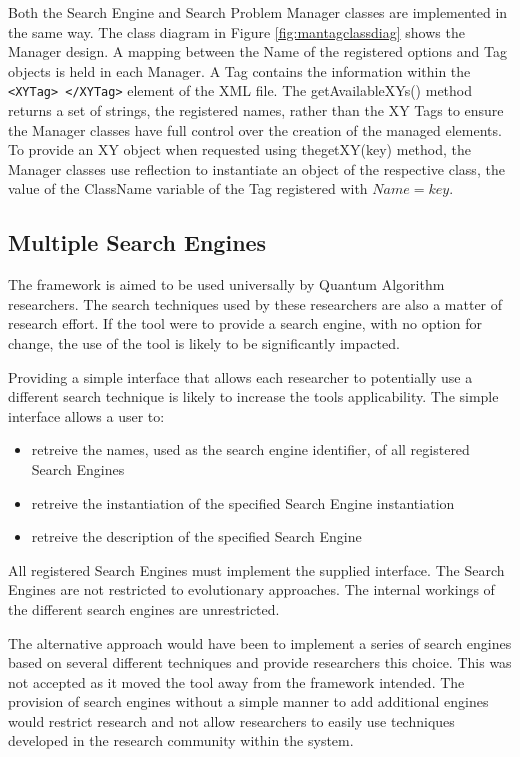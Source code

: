 Both the Search Engine and Search Problem Manager classes are implemented in the same way.
The class diagram in Figure \ref{fig:mantagclassdiag} shows the Manager design.
A mapping between the Name of the registered options and Tag objects is held in each Manager.
A Tag contains the information within the \lstinline{<XYTag> </XYTag>} element of the XML file.
The getAvailableXYs() method returns a set of strings, the registered names, rather than the XY Tags to ensure the Manager classes have full control over the creation of the managed elements.
To provide an XY object when requested using thegetXY(key) method, the Manager classes use reflection to instantiate an object of the respective class, the value of the ClassName variable of the Tag registered with $Name=key$.

\subsection{Multiple Search Engines}
\label{sec:mulsearchen}
The framework is aimed to be used universally by Quantum Algorithm researchers.
The search techniques used by these researchers are also a matter of research effort.
If the tool were to provide a search engine, with no option for change, the use of the tool is likely to be significantly impacted.

Providing a simple interface that allows each researcher to potentially use a different search technique is likely to increase the tools applicability.
The simple interface allows a user to:
\begin{itemize}
 \item retreive the names, used as the search engine identifier, of all registered Search Engines
 \item retreive the instantiation of the specified Search Engine instantiation
 \item retreive the description of the specified Search Engine
\end{itemize}

All registered Search Engines must implement the supplied interface.
The Search Engines are not restricted to evolutionary approaches.
The internal workings of the different search engines are unrestricted.

The alternative approach would have been to implement a series of search engines based on several different techniques and provide researchers this choice.
This was not accepted as it moved the tool away from the framework intended.
The provision of search engines without a simple manner to add additional engines would restrict research and not allow researchers to easily use techniques developed in the research community within the system.

